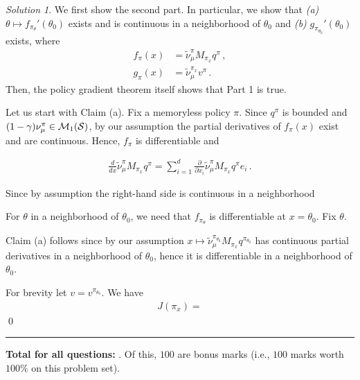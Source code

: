 \documentclass{article}
\newcommand{\todoc}[1]{\todo[color=orange!20!white]{Cs: #1}}
\DeclareMathOperator*{\1}{\mathbbm{1}}
\newcommand{\0}{\mathbf{0}}
\newcounter{DocPoints} %
\theoremstyle{definition}
\newtheorem{question}{Question}
\theoremstyle{remark}
\newtheorem*{solution*}{Solution}
\theoremstyle{theorem}
\newcommand{\cS}{\mathcal{S}}
\begin{document}
\begin{solution*}
We first show the second part.
In particular, we show that 
{\em (a)} $\theta \mapsto f_{\pi_\theta}'(\theta_0)$ exists and is continuous in a neighborhood of $\theta_0$ and {\em (b)} $g_{\pi_{\theta_0}}'(\theta_0)$ exists,
 where
\begin{align*}
f_\pi(x) &= \tilde\nu_\mu^\pi M_{\pi_x} q^\pi\,,\\
g_\pi(x) &=\tilde \nu_\mu^{\pi_x} v^\pi\,.
\end{align*}
Then, the policy gradient theorem itself shows that Part 1 is true.

Let us start with Claim (a).
Fix a memoryless policy $\pi$. 
Since $q^\pi$ is bounded and $(1-\gamma)\nu_\mu^\pi\in \cM_1(\cS)$, 
by our assumption
the partial derivatives of $f_\pi(x)$ exist and are continuous.
Hence, $f_\pi$ is differentiable and

\begin{align*}
\frac{d}{dx}
\tilde\nu_\mu^\pi M_{\pi_x} q^\pi
= 
\sum_{i=1}^d
\frac{\partial}{\partial x_i} \tilde\nu_\mu^\pi M_{\pi_x} q^\pi e_i\,.
\end{align*}

Since by assumption the right-hand side is continuous in a neighborhood 

For $\theta$ in a neighborhood of $\theta_0$, we need that 
$f_{\pi_\theta}$ is differentiable at $x=\theta_0$.
Fix $\theta$.



Claim (a) follows since by our assumption $x\mapsto \tilde \nu_\mu^{\pi_{\theta_0}} M_{\pi_x} q^{\pi_{\theta_0}}$ has continuous partial derivatives \todoc{really?} in a neighborhood of $\theta_0$,
hence it is differentiable in a neighborhood of $\theta_0$.


For brevity let $v = v^{\pi_{\theta_0}}$.
We have
\begin{align*}
J(\pi_x) = 
\end{align*}
\qed\par\smallskip\hrule
\end{solution*}




\bigskip
\bigskip

\noindent
\textbf{
Total for all questions: }.
Of this, $100$ are bonus marks (i.e., $100$ marks worth $100\%$ on this problem set).
\end{document}
